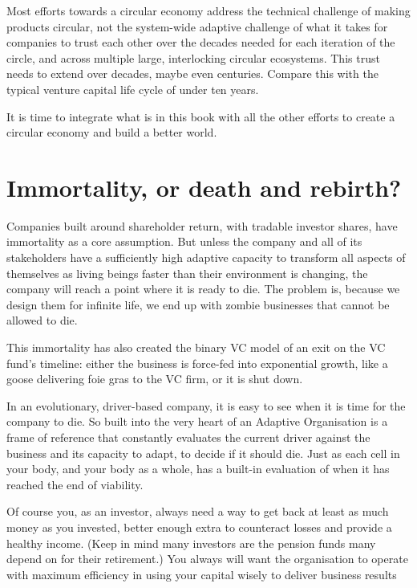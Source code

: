 Most efforts towards a circular economy address the technical challenge of making products circular, not the system-wide adaptive challenge of what it takes for companies to trust each other over the decades needed for each iteration of the circle, and across multiple large, interlocking circular ecosystems. This trust needs to extend over decades, maybe even centuries. Compare this with the typical venture capital life cycle of under ten years.


It is time to integrate what is in this book with all the other efforts to create a circular economy and build a better world. 


\section{Immortality, or death and rebirth?}
\label{section:immortality-or-death}
Companies built around shareholder return, with tradable investor shares, have immortality as a core assumption. But unless the company and all of its stakeholders have a sufficiently high adaptive capacity to transform all aspects of themselves as living beings faster than their environment is changing, the company will reach a point where it is ready to die. The problem is, because we design them for infinite life, we end up with zombie businesses that cannot be allowed to die.


This immortality has also created the binary VC model of an exit on the VC fund's timeline: either the business is force-fed into exponential growth, like a goose delivering foie gras to the VC firm, or it is shut down. 


In an evolutionary, driver-based company, it is easy to see when it is time for the company to die. So built into the very heart of an Adaptive Organisation is a frame of reference that constantly evaluates the current driver against the business and its capacity to adapt, to decide if it should die. Just as each cell in your body, and your body as a whole, has a built-in evaluation of when it has reached the end of viability. 


Of course you, as an investor, always need a way to get back at least as much money as you invested, better enough extra to counteract losses and provide a healthy income. (Keep in mind many investors are the pension funds many depend on for their retirement.) You always will want the organisation to operate with maximum efficiency in using your capital wisely to deliver business results 


